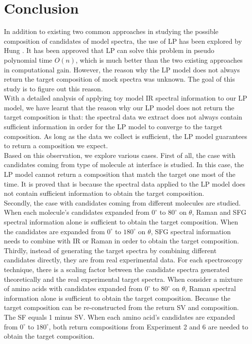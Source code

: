   \label{ch:7}

\section{Conclusion}
In addition to existing two common approaches in studying the possible composition of candidates of model spectra, the use of LP has been explored by Hung \cite{KuoKaiHung:Thesis:2015}. It has been approved that LP can solve this problem in  pseudo polynomial time $O(n)$, which is much better than the two existing approaches in computational gain. However, the reason why the LP model does not always return the target composition of mock spectra was unknown. The goal of this study is to figure out this reason. \\

With a detailed analysis of applying toy model IR spectral information to our LP model, we have learnt that the reason why our LP model does not return the target composition is that: the spectral data we extract does not always contain sufficient information in order for the LP model to converge to the target composition. As long as the data we collect is sufficient, the LP model guarantees to return a composition we expect. \\

Based on this observation, we explore various cases. First of all, the case with candidates coming from type of molecule at interface is studied. In this case, the LP model cannot return a composition that match the target one most of the time. It is proved that is because the spectral data applied to the LP model does not contain sufficient information to obtain the target composition. \\

Secondly, the case with candidates coming from different molecules are studied. When each molecule's candidates expanded from $0^{\circ}$ to $80^{\circ}$ on $\theta$, Raman and SFG spectral information alone is sufficient to obtain the target composition. When the candidates are expanded from $0^{\circ}$ to $180^{\circ}$ on $\theta$, SFG spectral information needs to combine with IR or Raman in order to obtain the target composition. \\

Thirdly, instead of generating the target spectra by combining different candidates directly, they are from real experimental data. For each spectroscopy technique, there is a scaling factor between the candidate spectra generated theoretically and the real experimental target spectra. When consider a mixture of amino acids with candidates expanded from $0^{\circ}$ to $80^{\circ}$ on $\theta$, Raman spectral information alone is sufficient to obtain the target composition. Because the target composition can be re-constructed from the return SV and composition. The SF equals 1 minus SV. When each amino acid's candidates are expanded from $0^{\circ}$ to $180^{\circ}$, both return compositions from Experiment 2 and 6 are needed to obtain the target composition. \\


